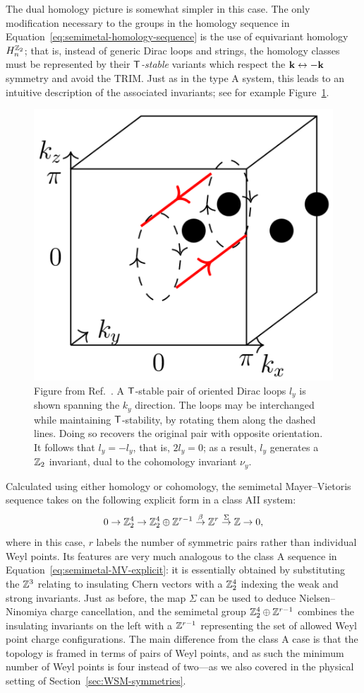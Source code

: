 The dual homology picture is somewhat simpler in this case. The only modification necessary to the groups in the homology sequence in Equation~\eqref{eq:semimetal-homology-sequence} is the use of equivariant homology $H_n^{\mathbb{Z}_2}$; that is, instead of generic Dirac loops and strings, the homology classes must be represented by their \emph{$\mathsf{T}$-stable} variants which respect the $\vb{k}\leftrightarrow-\vb{k}$ symmetry and avoid the TRIM. Just as in the type A system, this leads to an intuitive description of the associated invariants; see for example Figure~\ref{fig:TRS-loops}.
\begin{figure}[htb!]
	\centering
	\includegraphics[width=.5\linewidth]{Images/TRS-loops}
	\caption{Figure from Ref.~\cite{Thiang_equivariant}. A $\mathsf{T}$-stable pair of oriented Dirac loops $l_y$ is shown spanning the $k_y$ direction. The loops may be interchanged while maintaining $\mathsf{T}$-stability, by rotating them along the dashed lines. Doing so recovers the original pair with opposite orientation. It follows that $l_y=-l_y$, that is, $2l_y = 0$; as a result, $l_y$ generates a $\mathbb{Z}_2$ invariant, dual to the cohomology invariant $\nu_y$.}
	\label{fig:TRS-loops}
\end{figure}

Calculated using either homology or cohomology, the semimetal Mayer--Vietoris sequence takes on the following explicit form in a class AII system:
\begin{equation}\label{eq:TRS-MV-explicit}
	0 \to \mathbb{Z}_2^4 \to \mathbb{Z}_2^4\oplus\mathbb{Z}^{r-1} \overset{\beta}{\to} \mathbb{Z}^r \overset{\Sigma}{\to} \mathbb{Z} \to 0,
\end{equation}
where in this case, $r$ labels the number of symmetric pairs rather than individual Weyl points. Its features are very much analogous to the class A sequence in Equation~\eqref{eq:semimetal-MV-explicit}: it is essentially obtained by substituting the $\mathbb{Z}^3$ relating to insulating Chern vectors with a $\mathbb{Z}_2^4$ indexing the weak and strong invariants. Just as before, the map $\Sigma$ can be used to deduce Nielsen--Ninomiya charge cancellation, and the semimetal group $\mathbb{Z}_2^4\oplus\mathbb{Z}^{r-1}$ combines the insulating invariants on the left with a $\mathbb{Z}^{r-1}$ representing the set of allowed Weyl point charge configurations. The main difference from the class A case is that the topology is framed in terms of pairs of Weyl points, and as such the minimum number of Weyl points is four instead of two---as we also covered in the physical setting of Section~\ref{sec:WSM-symmetries}.

